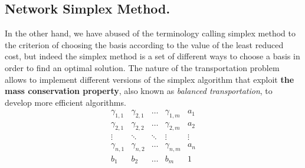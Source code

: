 \subsection{Network Simplex Method.}
In the other hand, we have abused of the terminology calling simplex method to the criterion of choosing the basis according to the value of the least reduced cost, but indeed the simplex method is a set of different ways to choose a basis in order to find an optimal solution. The nature of the transportation problem allows to implement different versions of the simplex algorithm that exploit \textbf{the mass conservation property}, also known as \emph{balanced transportation}, to develop more efficient algorithms.\\

\begin{equation*}
\begin{array}{cccc|c}
\gamma_{1,1}&\gamma_{2,1}&\dots&\gamma_{1,m}&a_{1}\\
\gamma_{2,1}&\gamma_{2,2}&\dots&\gamma_{2,m}&a_{2}\\
\vdots&\ddots&\ddots&\vdots&\vdots\\
\gamma_{n,1}&\gamma_{n,2}&\dots&\gamma_{n,m}&a_{n}\\
\hline
b_{1}&b_{2}&\dots&b_{m}& 1\\
\end{array}
\end{equation*}

